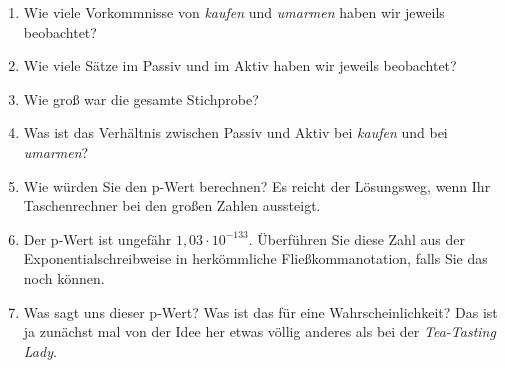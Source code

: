 \begin{enumerate}\Lf
  \item Wie viele Vorkommnisse von \textit{kaufen} und \textit{umarmen} haben wir jeweils beobachtet? 
  \item Wie viele Sätze im Passiv und im Aktiv haben wir jeweils beobachtet? 
  \item Wie groß war die gesamte Stichprobe? 
  \item Was ist das Verhältnis zwischen Passiv und Aktiv bei \textit{kaufen} und bei \textit{umarmen}? 
  \item Wie würden Sie den p-Wert berechnen? Es reicht der Lösungsweg, wenn Ihr Taschenrechner bei den großen Zahlen aussteigt.
  \item Der p-Wert ist ungefähr $1,03\cdot 10^{-133}$. Überführen Sie diese Zahl aus der Exponentialschreibweise in herkömmliche Fließkommanotation, falls Sie das noch können.
  \item Was sagt uns dieser p-Wert? Was ist das für eine Wahrscheinlichkeit? Das ist ja zunächst mal von der Idee her etwas völlig anderes als bei der \textit{Tea-Tasting Lady}.

\end{enumerate}
